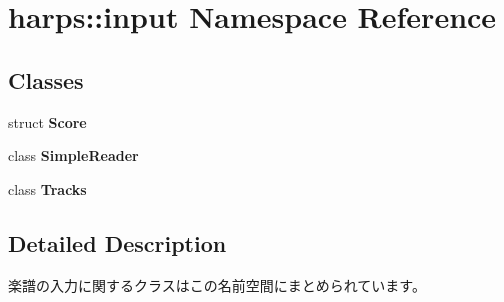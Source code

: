 \section{harps::input Namespace Reference}
\label{namespaceharps_1_1input}


\subsection*{Classes}
\begin{CompactItemize}
\item 
struct {\bf Score}
\item 
class {\bf SimpleReader}
\item 
class {\bf Tracks}
\end{CompactItemize}


\subsection{Detailed Description}
楽譜の入力に関するクラスはこの名前空間にまとめられています。 